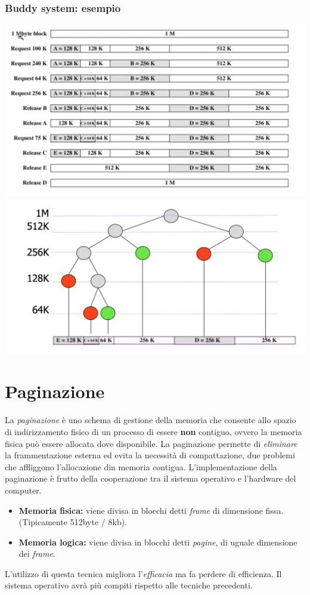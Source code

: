 \documentclass[a4paper,12pt, twoside]{report}
\begin{document}
\subsubsection{Buddy system: esempio}
\begin{center}
\includegraphics[scale=0.2]{buddy2}
\includegraphics[scale=0.19]{buddy1}
\end{center}



\section{Paginazione}

La \emph{paginazione} \`e uno schema di gestione della memoria che consente allo spazio di indirizzamento fisico di un
processo di essere \textbf{non} contiguo, ovvero la memoria fisica pu\`o essere allocata dove disponibile. 
La paginazione permette di \emph{eliminare} la frammentazione esterna ed evita la necessit\`a di compattazione, due
problemi che affliggono l'allocazione din memoria contigua. L'implementazione della paginazione \`e frutto della
cooperazione tra il sistema operativo e l'hardware del computer.
\begin{itemize}
    \item \textbf{Memoria fisica:} viene divisa in blocchi detti \emph{frame} di dimensione fissa. (Tipicamente 512byte / 8kb).
\item \textbf{Memoria logica:} viene divisa in blocchi detti \emph{pagine}, di uguale dimensione dei \emph{frame}.
\end{itemize}
L'utilizzo di questa tecnica migliora l'\emph{efficacia} ma fa perdere di efficienza. Il sistema operativo avr\`a pi\`u compiti rispetto alle tecniche precedenti. 
\end{document}
